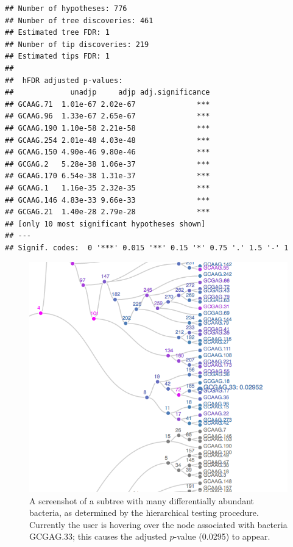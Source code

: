 \begin{knitrout}
\color{fgcolor}\begin{kframe}
\begin{alltt}
 \hlkwb{<-}  \hlstd{)}
\end{alltt}
\begin{verbatim}
## Number of hypotheses: 776 
## Number of tree discoveries: 461 
## Estimated tree FDR: 1 
## Number of tip discoveries: 219 
## Estimated tips FDR: 1 
## 
##  hFDR adjusted p-values: 
##             unadjp     adjp adj.significance
## GCAAG.71  1.01e-67 2.02e-67              ***
## GCAAG.96  1.33e-67 2.65e-67              ***
## GCAAG.190 1.10e-58 2.21e-58              ***
## GCAAG.254 2.01e-48 4.03e-48              ***
## GCAAG.150 4.90e-46 9.80e-46              ***
## GCGAG.2   5.28e-38 1.06e-37              ***
## GCAAG.170 6.54e-38 1.31e-37              ***
## GCAAG.1   1.16e-35 2.32e-35              ***
## GCAAG.146 4.83e-33 9.66e-33              ***
## GCGAG.21  1.40e-28 2.79e-28              ***
## [only 10 most significant hypotheses shown] 
## --- 
## Signif. codes:  0 '***' 0.015 '**' 0.15 '*' 0.75 '.' 1.5 '-' 1
\end{verbatim}
\begin{alltt}
  \hlstd{=} \hlstd{)} 
\end{alltt}
\end{kframe}
\end{knitrout}

\begin{figure}
  \centering
  \includegraphics[scale=0.4]{figure/structssi-screenshot.png}
  \caption{A screenshot of a subtree with many differentially abundant
    bacteria, as determined by the hierarchical testing
    procedure. Currently the user is hovering over the node associated
    with bacteria GCGAG.33; this causes the adjusted $p$-value (0.0295)
    to appear.}
  \label{fig:structssi-hfdr}
\end{figure}

